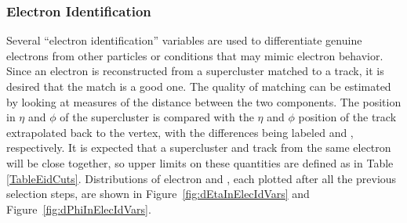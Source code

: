 

\subsubsection{Electron Identification}
\label{evSel:eid}
Several ``electron identification'' variables are used to differentiate genuine electrons  %
from other particles or conditions that may mimic electron behavior.  
Since an electron is reconstructed from a supercluster matched to a track, it is desired that the match is a good one.
The quality of matching can be estimated by looking at measures of the distance between the two components.
The position in $ \eta $ and $ \phi $ of the supercluster is compared with 
the $ \eta $ and $ \phi $ position of the track extrapolated back to the vertex, 
with the differences being labeled \detain and \dphiin, respectively.  
It is expected that a supercluster and track from the same electron will be close together, 
so upper limits on these quantities are defined as in Table \ref{TableEidCuts}.  
Distributions of electron \detain and \dphiin, 
each plotted after 
all the 
previous selection 
steps, %
are shown in Figure~\ref{fig:dEtaInElecIdVars} and 
Figure~\ref{fig:dPhiInElecIdVars}.  

